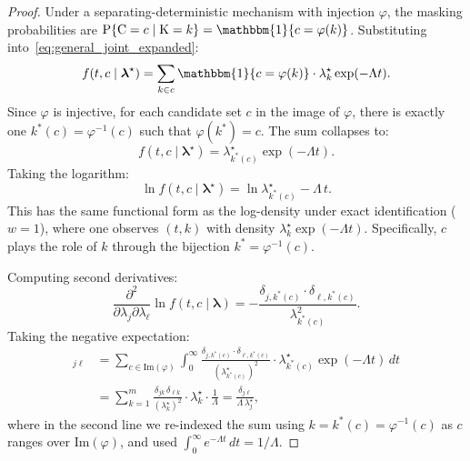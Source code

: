 \documentclass[preprint,12pt]{elsarticle}
\newcommand{\RV}[1]{\mathrm{#1}}
\newcommand{\Prob}[1]{\mathrm{P}\{#1\}}
\newcommand{\cand}{\RV{C}}         %
\newcommand{\tparam}[1]{{#1}^{\star}}  %
\newcommand{\infomatrx}{\mathcal{I}}
\newcommand{\pdf}{f}
\renewcommand{\vec}[1]{\boldsymbol{#1}}
\theoremstyle{definition}
\theoremstyle{remark}
\begin{document}
\begin{proof}
Under a separating-deterministic mechanism with injection $\varphi$, the masking
probabilities are $\Prob{\cand = c \mid \RV{K} = k} = \mathbbm{1}\{c =
\varphi(k)\}$. Substituting into~\eqref{eq:general_joint_expanded}:
\begin{equation}
\label{eq:det_joint}
\pdf(t, c \mid \tparam{\vec\lambda})
  = \sum_{k \in c} \mathbbm{1}\{c = \varphi(k)\} \cdot \tparam{\lambda}_k
    \exp(-\Lambda t).
\end{equation}
Since $\varphi$ is injective, for each candidate set $c$ in the image of
$\varphi$, there is exactly one $k^*(c) = \varphi^{-1}(c)$ such that
$\varphi(k^*) = c$. The sum collapses to:
\begin{equation}
\pdf(t, c \mid \tparam{\vec\lambda})
  = \tparam{\lambda}_{k^*(c)} \exp(-\Lambda t).
\end{equation}
Taking the logarithm:
\begin{equation}
\ln \pdf(t, c \mid \tparam{\vec\lambda})
  = \ln \tparam{\lambda}_{k^*(c)} - \Lambda\, t.
\end{equation}
This has the same functional form as the log-density under exact identification
($w=1$), where one observes $(t, k)$ with density
$\tparam{\lambda}_k \exp(-\Lambda t)$. Specifically, $c$ plays the role of $k$
through the bijection $k^* = \varphi^{-1}(c)$.

Computing second derivatives:
\begin{equation}
\frac{\partial^2}{\partial \lambda_j \partial \lambda_\ell}
  \ln \pdf(t, c \mid \vec\lambda)
  = - \frac{\delta_{j,k^*(c)} \cdot \delta_{\ell,k^*(c)}}{\lambda_{k^*(c)}^2}.
\end{equation}
Taking the negative expectation:
\begin{align}
[\infomatrx(\tparam{\vec\lambda} \mid \varphi)]_{j\ell}
  &= \sum_{c \in \mathrm{Im}(\varphi)} \int_0^\infty
     \frac{\delta_{j,k^*(c)} \cdot \delta_{\ell,k^*(c)}}{(\tparam{\lambda}_{k^*(c)})^2}
     \cdot \tparam{\lambda}_{k^*(c)} \exp(-\Lambda t)\, dt \nonumber\\
  &= \sum_{k=1}^{m}
     \frac{\delta_{jk}\,\delta_{\ell k}}{(\tparam{\lambda}_k)^2}
     \cdot \tparam{\lambda}_k \cdot \frac{1}{\Lambda}
  = \frac{\delta_{j\ell}}{\Lambda\, \tparam{\lambda}_j},
\end{align}
where in the second line we re-indexed the sum using $k = k^*(c) =
\varphi^{-1}(c)$ as $c$ ranges over $\mathrm{Im}(\varphi)$, and used
$\int_0^\infty e^{-\Lambda t}\, dt = 1/\Lambda$.
\end{proof}
\end{document}
